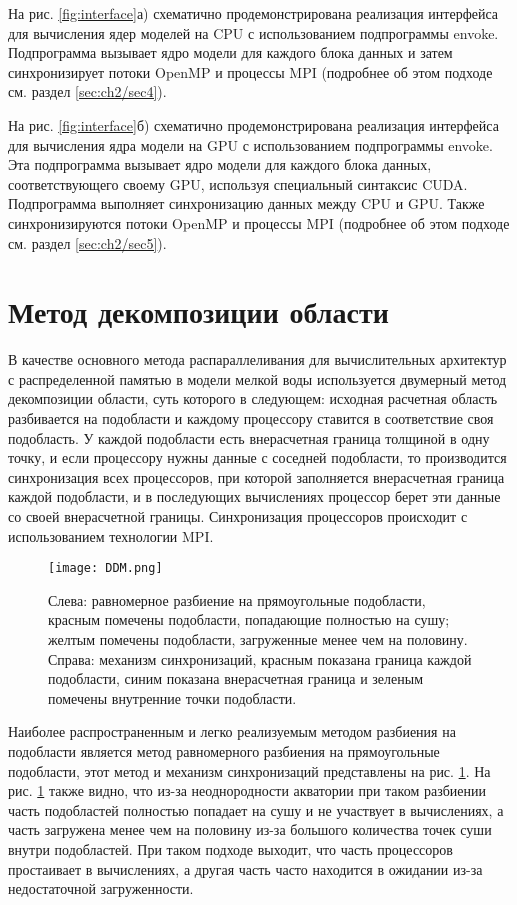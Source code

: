 На рис. \ref{fig:interface}а) схематично продемонстрирована реализация интерфейса для вычисления ядер моделей на CPU с использованием подпрограммы envoke. 
Подпрограмма вызывает ядро модели для каждого блока данных и затем синхронизирует потоки OpenMP и процессы MPI (подробнее об этом подходе см. раздел \ref{sec:ch2/sec4}).

На рис. \ref{fig:interface}б) схематично продемонстрирована реализация интерфейса для вычисления ядра модели на GPU с использованием подпрограммы envoke.
Эта подпрограмма вызывает ядро модели для каждого блока данных, соответствующего своему GPU, используя специальный синтаксис CUDA.
Подпрограмма выполняет синхронизацию данных между CPU и GPU. Также синхронизируются потоки OpenMP и процессы MPI (подробнее об этом подходе см. раздел \ref{sec:ch2/sec5}).

\section{Метод декомпозиции области}\label{sec:ch2/sec2}

В качестве основного метода распараллеливания для вычислительных архитектур с распределенной памятью в модели мелкой воды используется двумерный метод декомпозиции области,
суть которого в следующем: исходная расчетная область разбивается на подобласти и каждому процессору ставится в соответствие своя подобласть.
У каждой подобласти есть внерасчетная граница толщиной в одну точку, и если процессору нужны данные с соседней подобласти,
то производится синхронизация всех процессоров, при которой заполняется внерасчетная граница каждой подобласти,
и в последующих вычислениях процессор берет эти данные со своей внерасчетной границы. Синхронизация процессоров происходит с использованием технологии MPI.

\begin{figure}[htb!]
    \center
    \texttt{[image: DDM.png]}
    \caption{Слева: равномерное разбиение на прямоугольные подобласти, красным помечены подобласти, попадающие полностью на сушу;
    желтым помечены подобласти, загруженные менее чем на половину. Справа: механизм синхронизаций, красным показана граница каждой подобласти,
    синим показана внерасчетная граница и зеленым помечены внутренние точки подобласти.}
    \label{fig:ddm}
\end{figure}

Наиболее распространенным и легко реализуемым методом разбиения на подобласти является метод равномерного разбиения на прямоугольные подобласти,
этот метод и механизм синхронизаций представлены на рис. \ref{fig:ddm}. На рис. \ref{fig:ddm} также видно,
что из-за неоднородности акватории при таком разбиении часть подобластей полностью попадает на сушу и не участвует в вычислениях,
а часть загружена менее чем на половину из-за большого количества точек суши внутри подобластей.
При таком подходе выходит, что часть процессоров простаивает в вычислениях,
а другая часть часто находится в ожидании из-за недостаточной загруженности.

